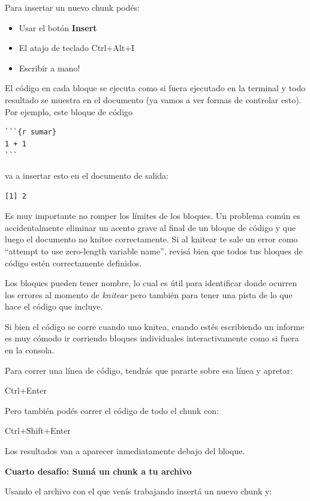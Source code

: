 \documentclass[
  openany]{book}
\providecommand{\tightlist}{%
  \setlength{\itemsep}{0pt}\setlength{\parskip}{0pt}}
\begin{document}
Para insertar un nuevo chunk podés:

\begin{itemize}
\tightlist
\item
  Usar el botón \textbf{Insert}
\item
  El atajo de teclado Ctrl+Alt+I
\item
  Escribir a mano!
\end{itemize}

El código en cada bloque se ejecuta como si fuera ejecutado en la terminal y todo resultado se muestra en el documento (ya vamos a ver formas de controlar esto).
Por ejemplo, este bloque de código

\begin{verbatim}
```{r sumar}
1 + 1
```
\end{verbatim}

va a insertar esto en el documento de salida:

\begin{verbatim}
[1] 2
\end{verbatim}

Es muy importante no romper los límites de los bloques.
Un problema común es accidentalmente eliminar un acento grave al final de un bloque de código y que luego el documento no knitee correctamente.
Si al knitear te sale un error como ``attempt to use zero-length variable name'', revisá bien que todos tus bloques de código estén correctamente definidos.

Los bloques pueden tener nombre, lo cual es útil para identificar donde ocurren los errores al momento de \emph{knitear} pero también para tener una pista de lo que hace el código que incluye.

Si bien el código se corre cuando uno knitea, cuando estés escribiendo un informe es muy cómodo ir corriendo bloques individuales interactivamente como si fuera en la consola.

Para correr una línea de código, tendrás que pararte sobre esa línea y apretar:

Ctrl+Enter

Pero también podés correr el código de todo el chunk con:

Ctrl+Shift+Enter

Los resultados van a aparecer inmediatamente debajo del bloque.

\textbf{Cuarto desafío: Sumá un chunk a tu archivo}

Usando el archivo con el que venís trabajando insertá un nuevo chunk y:
\end{document}
